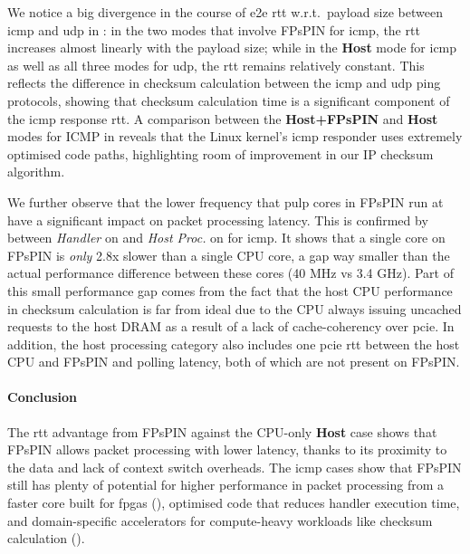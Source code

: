 We notice a big divergence in the course of \ac{e2e} \ac{rtt} w.r.t.\ payload size between \ac{icmp} and \ac{udp} in : in the two modes that involve FPsPIN for \ac{icmp}, the \ac{rtt} increases almost linearly with the payload size; while in the \textbf{Host} mode for \ac{icmp} as well as all three modes for \ac{udp},  the \ac{rtt} remains relatively constant.  This reflects the difference in checksum calculation between the \ac{icmp} and \ac{udp} ping protocols, showing that checksum calculation time is a significant component of the \ac{icmp} response \ac{rtt}.  A comparison between the \textbf{Host+FPsPIN} and \textbf{Host} modes for ICMP in  reveals that the Linux kernel's \ac{icmp} responder uses extremely optimised code paths, highlighting room of improvement in our IP checksum algorithm.

We further observe that the lower frequency that \ac{pulp} cores in FPsPIN run at have a significant impact on packet processing latency.  This is confirmed by  between \emph{Handler} on  and \emph{Host Proc.} on  for \ac{icmp}.  It shows that a single core on FPsPIN is \emph{only} \mytilde{}2.8x slower than a single CPU core, a gap way smaller than the actual performance difference between these cores (40 MHz vs 3.4 GHz).  Part of this small performance gap comes from the fact that the host CPU performance in checksum calculation is far from ideal due to the CPU always issuing uncached requests to the host DRAM as a result of a lack of cache-coherency over \ac{pcie}.  In addition, the host processing category also includes one \ac{pcie} \ac{rtt} between the host CPU and FPsPIN and polling latency, both of which are not present on FPsPIN.

\paragraph{Conclusion} The \ac{rtt} advantage from FPsPIN against the CPU-only \textbf{Host} case shows that FPsPIN allows packet processing with lower latency, thanks to its proximity to the data and lack of context switch overheads.  The \ac{icmp} cases show that FPsPIN still has plenty of potential for higher performance in packet processing from a faster core built for \ac{fpga}s (), optimised code that reduces handler execution time, and domain-specific accelerators for compute-heavy workloads like checksum calculation ().

